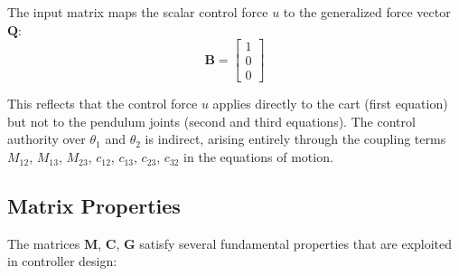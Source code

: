 The input matrix maps the scalar control force $u$ to the generalized force vector $\mathbf{Q}$:
\begin{equation}
\mathbf{B} = \begin{bmatrix} 1 \\ 0 \\ 0 \end{bmatrix}
\label{eq:input_matrix}
\end{equation}

This reflects that the control force $u$ applies directly to the cart (first equation) but not to the pendulum joints (second and third equations). The control authority over $\theta_1$ and $\theta_2$ is indirect, arising entirely through the coupling terms $M_{12}$, $M_{13}$, $M_{23}$, $c_{12}$, $c_{13}$, $c_{23}$, $c_{32}$ in the equations of motion.

\subsection{Matrix Properties}

The matrices $\mathbf{M}$, $\mathbf{C}$, $\mathbf{G}$ satisfy several fundamental properties that are exploited in controller design:

